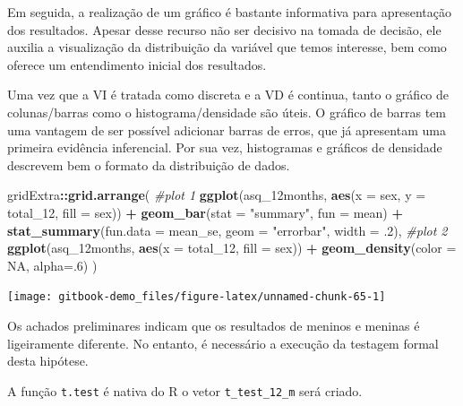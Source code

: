 \documentclass[
]{book}
\newenvironment{Shaded}{\begin{snugshade}}{\end{snugshade}}
\newcommand{\CommentTok}[1]{\textcolor[rgb]{0.56,0.35,0.01}{\textit{#1}}}
\newcommand{\DataTypeTok}[1]{\textcolor[rgb]{0.13,0.29,0.53}{#1}}
\newcommand{\DecValTok}[1]{\textcolor[rgb]{0.00,0.00,0.81}{#1}}
\newcommand{\FloatTok}[1]{\textcolor[rgb]{0.00,0.00,0.81}{#1}}
\newcommand{\KeywordTok}[1]{\textcolor[rgb]{0.13,0.29,0.53}{\textbf{#1}}}
\newcommand{\NormalTok}[1]{#1}
\newcommand{\OperatorTok}[1]{\textcolor[rgb]{0.81,0.36,0.00}{\textbf{#1}}}
\newcommand{\OtherTok}[1]{\textcolor[rgb]{0.56,0.35,0.01}{#1}}
\newcommand{\StringTok}[1]{\textcolor[rgb]{0.31,0.60,0.02}{#1}}
\begin{document}
Em seguida, a realização de um gráfico é bastante informativa para apresentação dos resultados. Apesar desse recurso não ser decisivo na tomada de decisão, ele auxilia a visualização da distribuição da variável que temos interesse, bem como oferece um entendimento inicial dos resultados.

Uma vez que a VI é tratada como discreta e a VD é continua, tanto o gráfico de colunas/barras como o histograma/densidade são úteis. O gráfico de barras tem uma vantagem de ser possível adicionar barras de erros, que já apresentam uma primeira evidência inferencial. Por sua vez, histogramas e gráficos de densidade descrevem bem o formato da distribuição de dados.

\begin{Shaded}
\begin{Highlighting}[]
\NormalTok{gridExtra}\OperatorTok{::}\KeywordTok{grid.arrange}\NormalTok{(}
  \CommentTok{#plot 1 }
  \KeywordTok{ggplot}\NormalTok{(asq_12months, }\KeywordTok{aes}\NormalTok{(}\DataTypeTok{x =}\NormalTok{ sex, }\DataTypeTok{y =}\NormalTok{ total_}\DecValTok{12}\NormalTok{, }\DataTypeTok{fill =}\NormalTok{ sex)) }\OperatorTok{+}
\StringTok{    }\KeywordTok{geom_bar}\NormalTok{(}\DataTypeTok{stat =} \StringTok{"summary"}\NormalTok{, }\DataTypeTok{fun =}\NormalTok{ mean) }\OperatorTok{+}
\StringTok{    }\KeywordTok{stat_summary}\NormalTok{(}\DataTypeTok{fun.data =}\NormalTok{ mean_se, }\DataTypeTok{geom =} \StringTok{"errorbar"}\NormalTok{, }\DataTypeTok{width =} \FloatTok{.2}\NormalTok{),}
  \CommentTok{#plot 2}
    \KeywordTok{ggplot}\NormalTok{(asq_12months, }\KeywordTok{aes}\NormalTok{(}\DataTypeTok{x =}\NormalTok{ total_}\DecValTok{12}\NormalTok{, }\DataTypeTok{fill =}\NormalTok{ sex)) }\OperatorTok{+}\StringTok{ }
\StringTok{    }\KeywordTok{geom_density}\NormalTok{(}\DataTypeTok{color =} \OtherTok{NA}\NormalTok{, }\DataTypeTok{alpha=}\NormalTok{.}\DecValTok{6}\NormalTok{)}
\NormalTok{)}
\end{Highlighting}
\end{Shaded}

\begin{center}\texttt{[image: gitbook-demo\_files/figure-latex/unnamed-chunk-65-1]} \end{center}

Os achados preliminares indicam que os resultados de meninos e meninas é ligeiramente diferente. No entanto, é necessário a execução da testagem formal desta hipótese.

A função \texttt{t.test} é nativa do R o vetor \texttt{t\_test\_12\_m} será criado.
\end{document}
